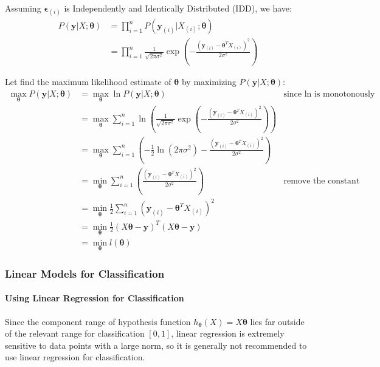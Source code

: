 \documentclass{article}
\renewcommand{\pmb}[1]{\boldsymbol{#1}}
\begin{document}
Assuming $\pmb\epsilon_{(i)}$ is Independently and Identically Distributed (IDD), we have:
\begin{align*}
    P(\pmb{y}|X;\pmb{\theta}) &= \prod_{i=1}^n P(\pmb{y}_{(i)} | X_{(i)} ; \pmb{\theta}) \\ 
    &= \prod_{i=1}^n \frac{1}{\sqrt{2\pi\sigma^2}} \exp{\left(-\frac{(\pmb{y}_{(i)} - \pmb{\theta}^T X_{(i)})^2}{2\sigma^2}\right)}
\end{align*}

Let find the maximum likelihood estimate of $\pmb{\theta}$ by maximizing $P(\pmb{y}|X;\pmb{\theta})$:
\begin{align*}
    \max_{\pmb\theta} P(\pmb{y}|X;\pmb{\theta}) &= \max_{\pmb{\theta}} \ln{ P(\pmb{y}|X;\pmb{\theta}) } & \text{since $\ln$ is monotonously increasing } \\ 
    &= \max_{\pmb{\theta}} \sum_{i=1}^n \ln {\left( \frac{1}{\sqrt{2\pi\sigma^2}} \exp{\left(-\frac{(\pmb{y}_{(i)} - \pmb{\theta}^T X_{(i)})^2}{2\sigma^2}\right)} \right)} \\ 
    &= \max_{\pmb{\theta}} \sum_{i=1}^n \left( -\frac{1}{2} \ln{(2\pi\sigma^2)} - \frac{(\pmb{y}_{(i)} - \pmb{\theta}^T X_{(i)})^2}{2\sigma^2} \right) \\ 
    &= \min_{\pmb{\theta}} \sum_{i=1}^n \left( \frac{(\pmb{y}_{(i)} - \pmb{\theta}^T X_{(i)})^2}{2\sigma^2} \right) & \text{remove the constant term} \\ 
    &= \min_{\pmb{\theta}} \frac{1}{2} \sum_{i=1}^n (\pmb{y}_{(i)} - \pmb{\theta}^T X_{(i)})^2 \\ 
    &= \min_{\pmb\theta} \frac{1}{2} (X\pmb\theta - \pmb y)^T (X\pmb\theta - \pmb y) \\ 
    &= \min_{\pmb\theta} l(\pmb{\theta})
\end{align*} 

\subsubsection{Linear Models for Classification}
\paragraph{Using Linear Regression for Classification}
Since the component range of hypothesis function $h_{\pmb{\theta}}(X) = X\pmb{\theta}$ lies far outside of the relevant range for classification $[0,1]$, linear regression is extremely sensitive to data points with a large norm, so it is generally not recommended to use linear regression for classification.
\end{document}
